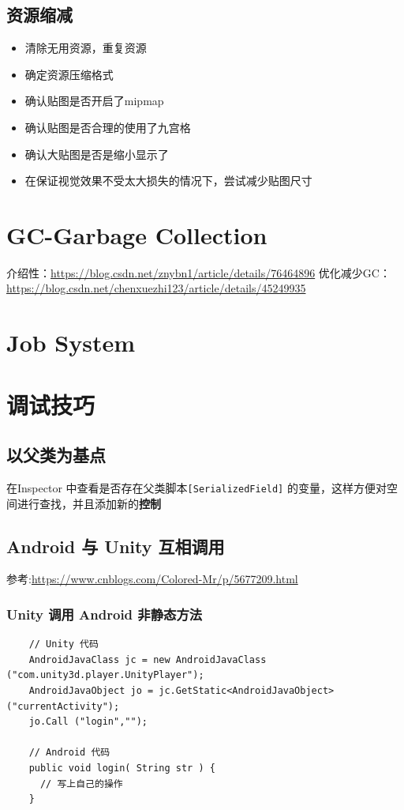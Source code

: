 \documentclass[UTF8,a4paper,12pt]{ctexbook}
\begin{document}
		
	\section{资源缩减}
		\begin{itemize}
			\item 清除无用资源，重复资源
			\item 确定资源压缩格式
			\item 确认贴图是否开启了mipmap
			\item 确认贴图是否合理的使用了九宫格
			\item 确认大贴图是否是缩小显示了
			\item 在保证视觉效果不受太大损失的情况下，尝试减少贴图尺寸
		\end{itemize}	
		
\chapter{GC-Garbage Collection}
	介绍性：\url{https://blog.csdn.net/znybn1/article/details/76464896}
	优化减少GC：\url{https://blog.csdn.net/chenxuezhi123/article/details/45249935}


\chapter{Job System}

		

\chapter{调试技巧}
	\section{以父类为基点}
		在Inspector 中查看是否存在父类脚本\verb|[SerializedField]| 的变量，这样方便对空间进行查找，并且添加新的\textbf{控制}			
	
	
	\section{Android 与 Unity 互相调用}
		参考:\url{https://www.cnblogs.com/Colored-Mr/p/5677209.html}

		\subsection{Unity 调用 Android 非静态方法}
			\begin{lstlisting}
	// Unity 代码
	AndroidJavaClass jc = new AndroidJavaClass ("com.unity3d.player.UnityPlayer");
	AndroidJavaObject jo = jc.GetStatic<AndroidJavaObject> ("currentActivity");
	jo.Call ("login","");	
	
	// Android 代码
	public void login( String str ) {      
      // 写上自己的操作
	}
			\end{lstlisting}
		
\end{document}
